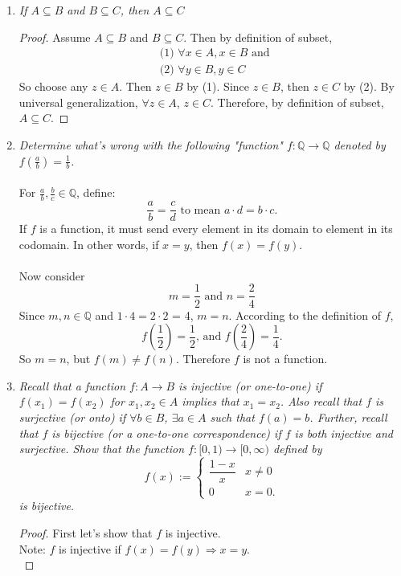 \documentclass{amsart}
\begin{document}
\begin{enumerate}[1.]
\newpage

\item \emph{If $A\subseteq B$ and $B\subseteq C$, then $A\subseteq C$}
\begin{proof}
Assume $A\subseteq B$ and $B\subseteq C$. Then by definition of subset,
\begin{align*}
    &\text{(1) }\forall x\in A, x\in B \text{ and }\\
    &\text{(2) }\forall y\in B, y\in C
\end{align*}
So choose any $z\in A$. Then $z\in B$ by (1). Since $z\in B$, then
$z\in C$ by (2). By universal generalization, $\forall z\in A$,
$z\in C$. Therefore, by definition of subset, $A\subseteq C$.
\end{proof}

\newpage

\item \emph{Determine what's wrong with the following "function" 
$f:\mathbb{Q}\to \mathbb{Q}$ denoted by $f(\frac{a}{b})=\frac{1}{b}$.} \\\\
For $\frac{a}{b}, \frac{b}{c}\in \mathbb{Q}$, define:
\[
    \frac{a}{b} = \frac{c}{d} \text{ to mean } a\cdot d = b\cdot c.
\] 
If $f$ is a function, it must send every element in its domain to
 element in its codomain. In other words, if
$x=y$, then $f(x)=f(y)$.\\\\

Now consider
\[
    m = \frac{1}{2} \text{ and } n = \frac{2}{4}    
\]
Since $m, n\in\mathbb{Q}$ and $1\cdot 4 = 2\cdot 2$ = 4, $m=n$. According
to the definition of $f$,
\[
    f\left(\frac{1}{2}\right) = \frac{1}{2} \text{, and }
    f\left(\frac{2}{4}\right) = \frac{1}{4}.
\]
So $m = n$, but $f(m)\neq f(n)$. Therefore $f$ is not a function.

\newpage

\item \emph{Recall that a function $f:A\to B$ is \emph{injective} (or one-to-one) if $f(x_1)=f(x_2)$ for $x_1,x_2\in A$ implies that $x_1=x_2$.  Also recall that $f$ is \emph{surjective} (or onto) if $\forall b\in B$, $\exists a\in A$ such that $f(a)=b$.  Further, recall that $f$ is \emph{bijective} (or a one-to-one correspondence) if $f$ is both injective and surjective. Show that the function $f:[0,1)\to [0,\infty)$ defined by
\[ 	f(x):= \begin{cases} \dfrac{1-x}{x} &  x\neq 0 \\
		                 0 & x=0. \end{cases} \]
is bijective.
}
\begin{proof} First let's show that $f$ is injective. \\
Note: $f$ is injective if $f(x) = f(y) \Rightarrow x = y$.\\


\end{proof}
\end{enumerate}
\end{document}

